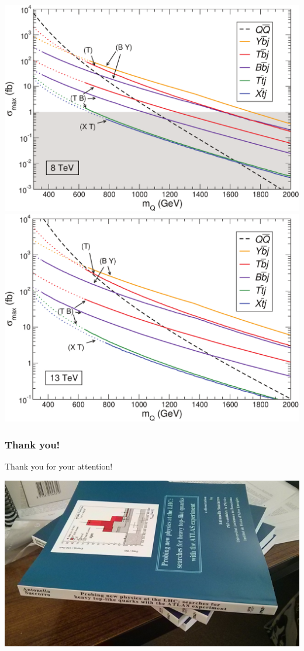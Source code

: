 \begin{frame}
\begin{minipage}{.6\textwidth}
\end{minipage}\begin{minipage}{.4\textwidth}\centering
\includegraphics[width=.85\textwidth]{pics/ja/fig4a}\\
\includegraphics[width=.85\textwidth]{pics/ja/fig4b}
\end{minipage}

\end{frame}


\begin{frame}\frametitle{Thank you!}
\large\centering


Thank you for your attention!

\myskip

\includegraphics[width=.5\textwidth]{pics/boooks.jpg}

\end{frame}

